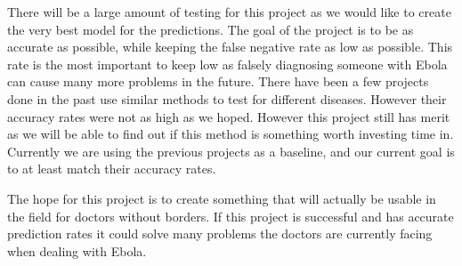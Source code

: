 ﻿\documentclass[onecolumn, draftclsnofoot,10pt, compsoc]{IEEEtran}
\begin{document}
There will be a large amount of testing for this project as we would like to create the very best model for the predictions. The goal of the project is to be as accurate as possible, while keeping the false negative rate as low as possible. This rate is the most important to keep low as falsely diagnosing someone with Ebola can cause many more problems in the future. There have been a few projects done in the past use similar methods to test for different diseases. However their accuracy rates were not as high as we hoped. However this project still has merit as we will be able to find out if this method is something worth investing time in. Currently we are using the previous projects as a baseline, and our current goal is to at least match their accuracy rates.

The hope for this project is to create something that will actually be usable in the field for doctors without borders. If this project is successful and has accurate prediction rates it could solve many problems the doctors are currently facing when dealing with Ebola.




\end{document}
